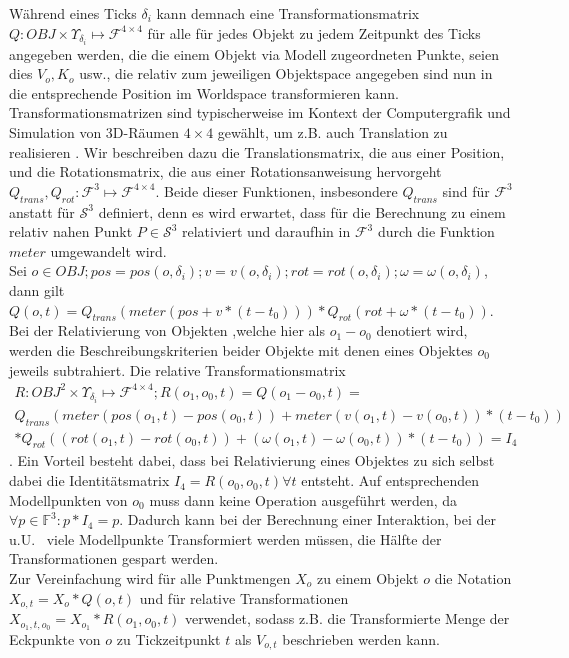 Während eines Ticks $\delta_i$ kann demnach eine Transformationsmatrix $Q: OBJ \times \Upsilon_{\delta_i} \mapsto \mathcal{F}^{4\times 4}$ für alle für jedes Objekt zu jedem Zeitpunkt des Ticks angegeben werden, die die einem Objekt via Modell zugeordneten Punkte, seien dies $V_o, K_o$ usw., die relativ zum jeweiligen Objektspace angegeben sind nun in die entsprechende Position im Worldspace transformieren kann. Transformationsmatrizen sind typischerweise im Kontext der Computergrafik und Simulation von 3D-Räumen $4\times 4$ gewählt, um z.B. auch Translation zu realisieren \cite[ch. 4.4.1, p.76]{fourcrossfour}. Wir beschreiben dazu die 
Translationsmatrix, die aus einer Position, und die Rotationsmatrix, die aus einer Rotationsanweisung hervorgeht $Q_{trans}, Q_{rot}:\mathcal{F}^3 \mapsto \mathcal{F}^{4\times 4}$. Beide dieser Funktionen, insbesondere $Q_{trans}$ sind für $\mathcal{F}^3$ anstatt für $\mathcal{S}^3$ definiert, denn es wird erwartet, dass für die Berechnung zu einem relativ nahen Punkt $P \in\mathcal{S}^3$ relativiert und daraufhin in $\mathcal{F}^3$ durch die Funktion $meter$ umgewandelt wird.\\
Sei $o \in OBJ; pos = pos(o, \delta_i); v = v(o, \delta_i); rot = rot(o, \delta_i); \omega = \omega(o, \delta_i)$, dann gilt
$Q(o, t) = Q_{trans}(meter(pos + v * (t-t_0))) * Q_{rot}(rot + \omega * (t - t_0))$.\\
Bei der Relativierung von Objekten ,welche hier als $o_1 - o_0$ denotiert wird, werden die Beschreibungskriterien beider Objekte mit denen eines Objektes $o_0$ jeweils subtrahiert. Die relative Transformationsmatrix 
\begin{align}
R: OBJ^2 \times \Upsilon_{\delta_i} \mapsto \mathcal{F}^{4\times 4}; R(o_1, o_0, t) = Q(o_1 - o_0, t) = \\
Q_{trans}( meter(  pos(o_1, t)-pos(o_0, t) ) + meter(v(o_1, t)-v(o_0, t)) * (t-t_0) ) \\
* Q_{rot}((rot(o_1, t)-rot(o_0, t)) + (\omega(o_1, t)-\omega(o_0, t)) * (t-t_0))= I_4
\end{align}
. Ein Vorteil besteht dabei, dass bei Relativierung eines Objektes zu sich selbst dabei die Identitätsmatrix $I_4 = R(o_0, o_0, t) \forall t$ entsteht. Auf entsprechenden Modellpunkten von $o_0$ muss dann keine Operation ausgeführt werden, da $\forall p\in \mathbb{F}^3: p*I_4=p$. Dadurch kann bei der Berechnung einer Interaktion, bei der u.U.~ viele Modellpunkte Transformiert werden müssen, die Hälfte der Transformationen gespart werden.\\
Zur Vereinfachung wird für alle Punktmengen $X_o$ zu einem Objekt $o$ die Notation $X_{o, t} = X_o * Q(o, t)$ und für relative Transformationen $X_{o_1, t, o_0} = X_{o_1} * R(o_1, o_0, t)$ verwendet, sodass z.B. die Transformierte Menge der Eckpunkte von $o$ zu Tickzeitpunkt $t$ als $V_{o,t}$ beschrieben werden kann.

